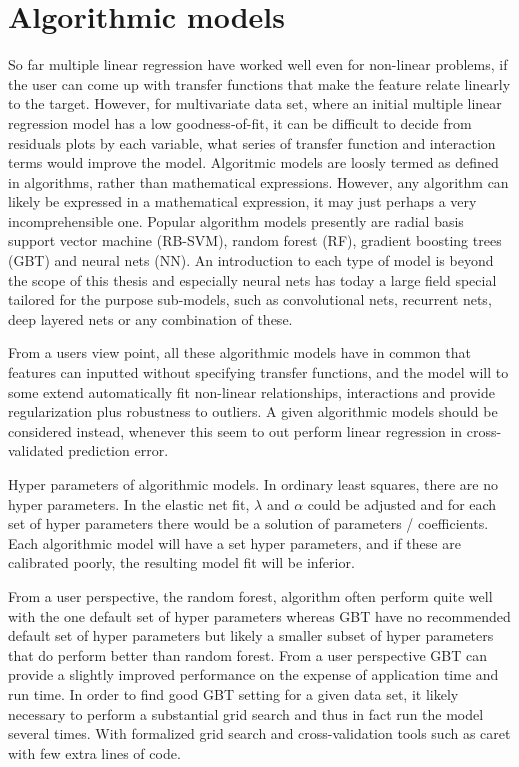 \section{Algorithmic models}
So far multiple linear regression have worked well even for non-linear problems, if the user can come up with transfer functions that make the feature relate linearly to the target. However, for multivariate data set, where an initial multiple linear regression model has a low goodness-of-fit, it can be difficult to decide from residuals plots by each variable, what series of transfer function and interaction terms would improve the model.  Algoritmic models are loosly termed as defined in algorithms, rather than mathematical expressions. However, any algorithm can likely be expressed in a mathematical expression, it may just perhaps a very incomprehensible one. Popular algorithm models presently are radial basis support vector machine (RB-SVM), random forest (RF), gradient boosting trees (GBT) and neural nets (NN). An introduction to each type of model is beyond the scope of this thesis and especially neural nets has today a large field special tailored for the purpose sub-models, such as convolutional nets, recurrent nets, deep layered nets or any combination of these. 

From a users view point, all these algorithmic models have in common that features can inputted without specifying transfer functions, and the model will to some extend automatically fit non-linear relationships, interactions and provide regularization plus robustness to outliers. A given algorithmic models should be considered instead, whenever this seem to out perform linear regression in cross-validated prediction error.

Hyper parameters of algorithmic models. In ordinary least squares, there are no hyper parameters. In the elastic net fit, $\lambda$ and $\alpha$ could be adjusted and for each set of hyper parameters there would be a solution of parameters / coefficients. Each algorithmic model will have a set hyper parameters, and if these are calibrated poorly, the resulting model fit will be inferior.

From a user perspective, the random forest, algorithm often perform quite well with the one default set of hyper parameters whereas GBT have no recommended default set of hyper parameters but likely a smaller subset of hyper parameters that do perform better than random forest. From a user perspective GBT can provide a slightly improved performance on the expense of application time and run time. In order to find good GBT setting for a given data set, it likely necessary to perform a substantial grid search and thus in fact run the model several times. With formalized grid search and cross-validation tools such as caret \cite{kuhn2015short} with few extra lines of code.

